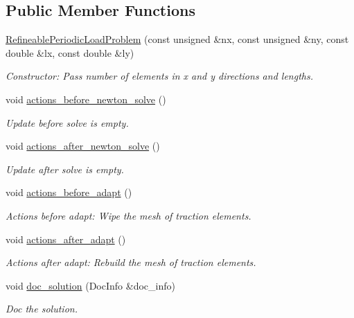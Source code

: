 \subsection*{Public Member Functions}
\begin{DoxyCompactItemize}
\item 
\hyperlink{classRefineablePeriodicLoadProblem_ae950fdcf80e684eddb29358e1f9a3412}{Refineable\+Periodic\+Load\+Problem} (const unsigned \&nx, const unsigned \&ny, const double \&lx, const double \&ly)
\begin{DoxyCompactList}\small\item\em Constructor\+: Pass number of elements in x and y directions and lengths. \end{DoxyCompactList}\item 
void \hyperlink{classRefineablePeriodicLoadProblem_aece9eef8c0bf14527ea1fb6902820cb4}{actions\+\_\+before\+\_\+newton\+\_\+solve} ()
\begin{DoxyCompactList}\small\item\em Update before solve is empty. \end{DoxyCompactList}\item 
void \hyperlink{classRefineablePeriodicLoadProblem_a5b1bd71066266f1eb1cc36d524d57894}{actions\+\_\+after\+\_\+newton\+\_\+solve} ()
\begin{DoxyCompactList}\small\item\em Update after solve is empty. \end{DoxyCompactList}\item 
void \hyperlink{classRefineablePeriodicLoadProblem_aae144ae04342a103a870d9dfbf29c188}{actions\+\_\+before\+\_\+adapt} ()
\begin{DoxyCompactList}\small\item\em Actions before adapt\+: Wipe the mesh of traction elements. \end{DoxyCompactList}\item 
void \hyperlink{classRefineablePeriodicLoadProblem_ad4fdb5d3805ea8dec6cedf515e5a73d7}{actions\+\_\+after\+\_\+adapt} ()
\begin{DoxyCompactList}\small\item\em Actions after adapt\+: Rebuild the mesh of traction elements. \end{DoxyCompactList}\item 
void \hyperlink{classRefineablePeriodicLoadProblem_ac10c477b8edd2d0b7d3a69e65184356a}{doc\+\_\+solution} (Doc\+Info \&doc\+\_\+info)
\begin{DoxyCompactList}\small\item\em Doc the solution. \end{DoxyCompactList}\end{DoxyCompactItemize}
